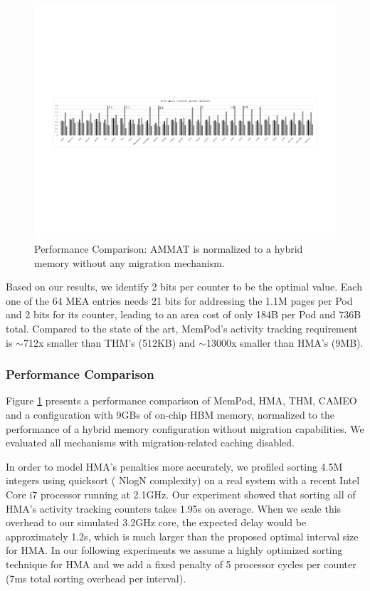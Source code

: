 \begin{figure}[t]
  \includegraphics[width=\textwidth]{figures/revised/new/comparison_no_cache.pdf}
  \caption{Performance Comparison: AMMAT is normalized to a hybrid memory without any migration mechanism.}
  \label{fig:performance}
\end{figure}

Based on our results, we identify 2 bits per counter to be the optimal value. Each one of the 64 MEA entries needs 21 bits for addressing the 1.1M pages per Pod and 2 bits for its counter, leading to an area cost of only 184B per Pod and 736B total. Compared to the state of the art, MemPod's activity tracking requirement is $\sim$712x smaller than THM's (512KB) and $\sim$13000x smaller than HMA's (9MB).



\subsubsection{Performance Comparison}
\label{sub:performance}

Figure \ref{fig:performance} presents a performance comparison of MemPod, HMA, THM, CAMEO and a configuration with 9GBs of on-chip HBM memory, normalized to the performance of a hybrid memory configuration without migration capabilities. We evaluated all mechanisms with migration-related caching disabled. 

In order to model HMA's penalties more accurately, we profiled sorting 4.5M integers using quicksort ( NlogN complexity) on a real system with a recent Intel Core i7 processor running at 2.1GHz. Our experiment showed that sorting all of HMA's activity tracking counters takes 1.95s on average. When we scale this overhead to our simulated 3.2GHz core, the expected delay would be approximately 1.2s, which is much larger than the proposed optimal interval size for HMA. In our following experiments we assume a highly optimized sorting technique for HMA and we add a fixed penalty of 5 processor cycles per counter (7ms total sorting overhead per interval).

